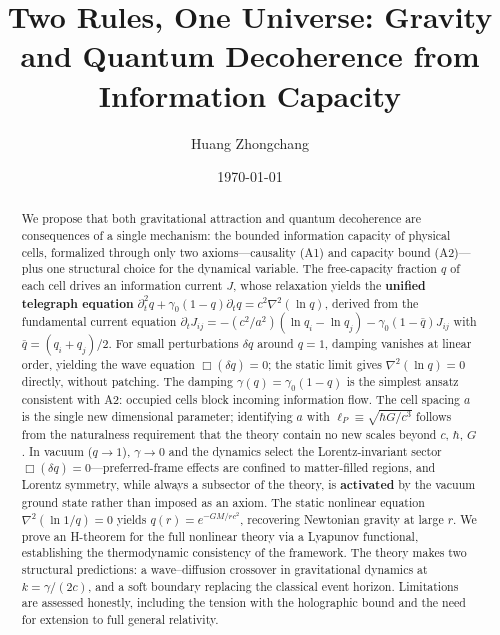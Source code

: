 \documentclass[aps,prd,twocolumn,showpacs,superscriptaddress,preprintnumbers]{revtex4-2}
\begin{document}
\title{Two Rules, One Universe: Gravity and Quantum Decoherence from Information Capacity}

\author{Huang Zhongchang}

\date{\today}

\begin{abstract}
We propose that both gravitational attraction and quantum decoherence are consequences of a single mechanism: the bounded information capacity of physical cells, formalized through only two axioms---causality (A1) and capacity bound (A2)---plus one structural choice for the dynamical variable.
The free-capacity fraction $q$ of each cell drives an information current $J$, whose relaxation yields the \textbf{unified telegraph equation}
$\partial_t^2 q + \gamma_0(1-q)\partial_t q = c^2\nabla^2(\ln q)$,
derived from the fundamental current equation
$\partial_t J_{ij} = -(c^2/a^2)(\ln q_i - \ln q_j) - \gamma_0(1-\bar{q})J_{ij}$
with $\bar{q}=(q_i+q_j)/2$.
For small perturbations $\delta q$ around $q=1$, damping vanishes at linear order, yielding the wave equation $\Box(\delta q)=0$; the static limit gives $\nabla^2(\ln q)=0$ directly, without patching.
The damping $\gamma(q)=\gamma_0(1-q)$ is the simplest ansatz consistent with A2: occupied cells block incoming information flow.
The cell spacing $a$ is the single new dimensional parameter; identifying $a$ with $\ell_P\equiv\sqrt{\hbar G/c^3}$ follows from the naturalness requirement that the theory contain no new scales beyond $c$, $\hbar$, $G$.
In vacuum ($q\to1$), $\gamma\to0$ and the dynamics select the Lorentz-invariant sector $\Box(\delta q)=0$---preferred-frame effects are confined to matter-filled regions, and Lorentz symmetry, while always a subsector of the theory, is \textbf{activated} by the vacuum ground state rather than imposed as an axiom.
The static nonlinear equation $\nabla^2(\ln 1/q)=0$ yields $q(r)=e^{-GM/rc^2}$, recovering Newtonian gravity at large $r$.
We prove an H-theorem for the full nonlinear theory via a Lyapunov functional, establishing the thermodynamic consistency of the framework.
The theory makes two structural predictions: a wave--diffusion crossover in gravitational dynamics at $k=\gamma/(2c)$, and a soft boundary replacing the classical event horizon.
Limitations are assessed honestly, including the tension with the holographic bound and the need for extension to full general relativity.
\end{abstract}

\maketitle
\end{document}
